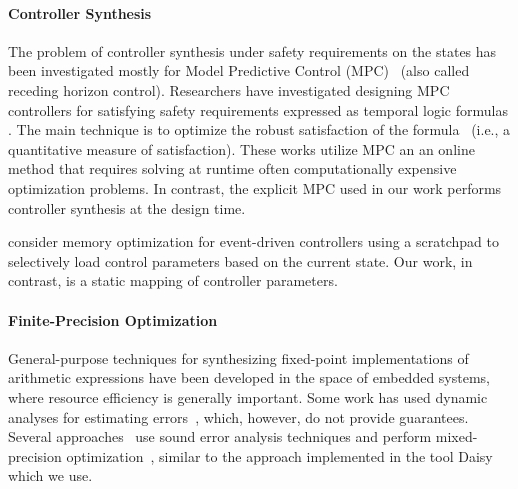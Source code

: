 \paragraph{Controller Synthesis}
The problem of controller synthesis under safety requirements on the states has
been investigated mostly for Model Predictive Control (MPC)~\cite{camacho2013model} (also called receding horizon control).
Researchers have investigated designing MPC controllers for satisfying safety requirements expressed as temporal logic formulas 
\cite{FMPS18,KaramanSF08,raman2014model,WongpiromsarnTM12,pant2017smooth,kim2017dynamic}.
The main technique is to optimize the robust satisfaction of 
the formula~\cite{donze2010robust} (i.e., a quantitative measure of satisfaction).
These works utilize MPC an an online method that requires solving at runtime often computationally 
expensive optimization problems. In contrast, the explicit MPC used in our work performs controller synthesis at the design time.

\citet{SahaM12} consider memory optimization for event-driven controllers
using a scratchpad to selectively load control parameters based on the current state.
Our work, in contrast, is a static mapping of controller parameters.


\paragraph{Finite-Precision Optimization}
General-purpose techniques for synthesizing fixed-point implementations of 
arithmetic expressions have been developed in the space of embedded systems,
where resource efficiency is generally important.
Some work has used dynamic analyses for estimating
errors~\cite{Gaffar2004,Mallik2007}, which, however, do not provide guarantees.
Several approaches~\cite{Lee2006,Osborne2007,Kinsman2009,Pang2011} use sound
error analysis techniques and perform mixed-precision optimization~\cite{Lee2006,Pang2011},
similar to the approach implemented in the tool Daisy which we use. 
